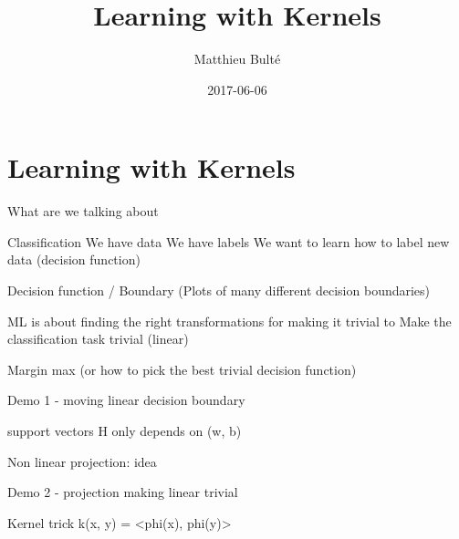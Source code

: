 \documentclass[bigger]{beamer}
\author{Matthieu Bulté}
\date{2017-06-06}
\title{Learning with Kernels}
\begin{document}
\maketitle

\section{Learning with Kernels}
\label{sec-1}

\begin{frame}[label=sec-1-1]{What are we talking about}
\end{frame}

\begin{frame}[label=sec-1-2]{Classification}
We have data
We have labels
We want to learn how to label new data (decision function)
\end{frame}


\begin{frame}[label=sec-1-3]{Decision function / Boundary (Plots of many different decision boundaries)}
\end{frame}


\begin{frame}[label=sec-1-4]{ML is about finding the right transformations for making it trivial to}
Make the classification task trivial (linear) 
\end{frame}


\begin{frame}[label=sec-1-5]{Margin max}
(or how to pick the best trivial decision function)
\end{frame}


\begin{frame}[label=sec-1-6]{Demo 1 - moving linear decision boundary}
\end{frame}

\begin{frame}[label=sec-1-7]{support vectors}
H only depends on (w, b)
\end{frame}

\begin{frame}[label=sec-1-8]{Non linear projection: idea}
\end{frame}

\begin{frame}[label=sec-1-9]{Demo 2 - projection making linear trivial}
\end{frame}

\begin{frame}[label=sec-1-10]{Kernel trick}
k(x, y) = <phi(x), phi(y)>
\end{frame}
\end{document}
